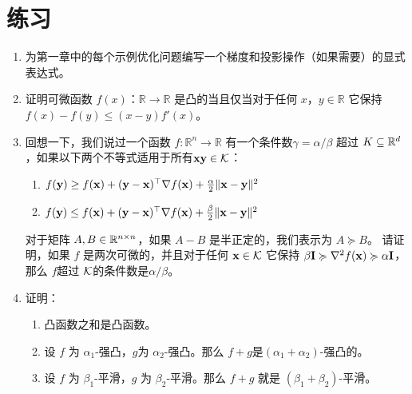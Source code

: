 \newpage
\section{
    练习
    }


\begin{enumerate}

\item
为第一章中的每个示例优化问题编写一个梯度和投影操作（如果需要）的显式表达式。

\item
证明可微函数 $f(x)：\mathbb{R}\rightarrow\mathbb{R}$ 是凸的当且仅当对于任何 $x，y\in\mathbb{R}$ 它保持$f(x)-f(y) \leq(x-y)f'(x)$。

\item
回想一下，我们说过一个函数 $f:\mathbb{R}^n\rightarrow\mathbb{R}$ 有一个条件数$\gamma = \alpha/\beta$ 超过 $K \subseteq {\mathbb R}^d$，如果以下两个不等式适用于所有$\mathbf x\mathbf y\in\mathcal K$：
\begin{enumerate}
\item $  f(\mathbf y) \geq f(\mathbf x) + (\mathbf y-\mathbf x)^{\top}\nabla{}f(\mathbf x) + \frac{\alpha}{2}\Vert{\ensuremath{\mathbf x}-\ensuremath{\mathbf y}}\Vert^2$
\item $  f(\mathbf y) \leq f(\mathbf x) + (\mathbf y-\mathbf x)^{\top}\nabla{}f(\mathbf x) + \frac{\beta}{2}\Vert{\ensuremath{\mathbf x}-\ensuremath{\mathbf y}}\Vert^2$
\end{enumerate}
对于矩阵 $A, B\in{\mathbb R}^{n\times n}$，如果 $A-B$ 是半正定的，我们表示为 $A \succcurlyeq B$。
请证明，如果 $f$ 是两次可微的，并且对于任何 $\mathbf x\in\mathcal K$ 它保持 $\beta\textbf{I}\succcurlyeq\nabla^2f(\mathbf x) \succcurlyeq \alpha\textbf{I}$，那么 $f$超过 $\mathcal K$的条件数是$\alpha/\beta$。


\item
证明：
\begin{enumerate}
	\item
    凸函数之和是凸函数。
	\item
    设 $f$ 为 $\alpha_1$-强凸，$g$为 $\alpha_2$-强凸。那么 $f+g$是$(\alpha_1+\alpha_2)$-强凸的。
	\item
    设 $f$ 为 $\beta_1$-平滑，$g$ 为 $\beta_2$-平滑。那么 $f+g$ 就是 $(\beta_1+\beta_2)$-平滑。
	

\end{enumerate}
\end{enumerate}
